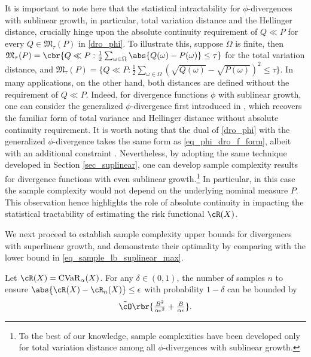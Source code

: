 \documentclass[9pt]{article} %
\numberwithin{equation}{section}
\renewcommand{\frac}[2]{\tfrac{#1}{#2}}
\begin{document}
\begin{remark}\label{remark_sublinear_generalized_phi}
It is important to note here that the statistical intractability for $\phi$-divergences with sublinear growth, in particular,  total variation distance and the Hellinger distance, crucially hinge upon the absolute continuity requirement of $Q \ll P$ for every $Q \in \mathfrak{M}_\tau (P)$ in \eqref{dro_phi}.
To illustrate this, suppose $\Omega$ is finite, then $\mathfrak{M}_\tau (P) = \cbr{Q \ll P: \frac{1}{2} \sum_{\omega \in \Omega} \abs{Q(\omega) - P(\omega)}  \leq \tau}$ for the total variation distance,
and 
$\mathfrak{M}_\tau (P) = \big\{Q \ll P: \frac{1}{2} \sum_{\omega \in \Omega} (\sqrt{Q(\omega) } - \sqrt{P(\omega)})^2  \leq \tau \big\}$.
In many applications, on the other hand, both distances are defined without the requirement of $Q \ll P$. 
Indeed, for divergence functions $\phi$ with sublinear growth, one can consider the generalized $\phi$-divergence first introduced in \cite{csiszar1963informationstheoretische,ali1966general}, 
which recovers the familiar form of total variance and Hellinger distance without absolute continuity requirement. 
It is worth noting that the dual of \eqref{dro_phi} with the generalized $\phi$-divergence takes the same form as \eqref{eq_phi_dro_f_form}, albeit with an additional constraint \cite{kuhn2025distributionally}. 
Nevertheless,  by adopting the same technique developed in Section \ref{sec_suplinear}, one can  develop sample complexity results for divergence functions with even sublinear growth.\footnote{
To the best of our knowledge,  sample complexities have been developed only  for total variation distance \cite{xu2023improved,yang2022toward,shi2023curious} among all $\phi$-divergences with sublinear growth.
} 
In particular, in this case the sample complexity would not depend on the underlying nominal measure $P$.
This observation hence highlights the role of absolute continuity in impacting the statistical tractability of estimating the risk functional $\cR(X)$.
\end{remark}


We next proceed to establish sample complexity upper bounds for divergences with superlinear growth,  and demonstrate their optimality by comparing with the lower bound in \eqref{eq_sample_lb_suplinear_max}.

\begin{corollary}\label{corr_cvar}
Let $\cR(X) = \mathrm{CVaR}_\alpha (X)$. 
For any $\delta \in (0,1)$, the number of samples $n$ to ensure $\abs{\cR(X) - \cR_n(X)} \leq \epsilon$ with probability $1-\delta$ can be bounded by 
\begin{align}\label{ineq_cvar_sample}
\tilde{\cO} \rbr{
\frac{ B^2 }{ \alpha \epsilon^2} 
+ 
\frac{B}{\alpha \epsilon} 
}.
\end{align}
\end{corollary}
\end{document}
